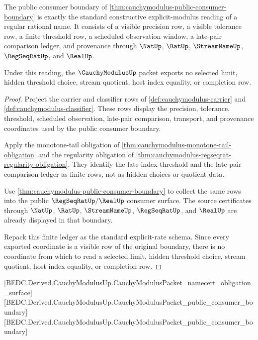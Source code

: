 \begin{theorem}
\label{thm:cauchymodulus-explicit-modulus-standard-bridge}
The public consumer boundary of
\autoref{thm:cauchymodulus-public-consumer-boundary} is exactly the standard
constructive explicit-modulus reading of a regular rational name. It consists
of a visible precision row, a visible tolerance row, a finite threshold row, a
scheduled observation window, a late-pair comparison ledger, and provenance
through $\NatUp$, $\RatUp$, $\StreamNameUp$, $\RegSeqRatUp$, and $\RealUp$.

Under this reading, the $\CauchyModulusUp$ packet exports no selected limit,
hidden threshold choice, stream quotient, host index equality, or completion
row.
\end{theorem}
\begin{proof}
Project the carrier and classifier rows of
\autoref{def:cauchymodulus-carrier} and
\autoref{def:cauchymodulus-classifier}. These rows display the precision,
tolerance, threshold, scheduled observation, late-pair comparison, transport,
and provenance coordinates used by the public consumer boundary.

Apply the monotone-tail obligation of
\autoref{thm:cauchymodulus-monotone-tail-obligation} and the regularity
obligation of \autoref{thm:cauchymodulus-regseqrat-regularity-obligation}.
They identify the late-index threshold and the late-pair comparison ledger as
finite rows, not as hidden choices or quotient data.

Use \autoref{thm:cauchymodulus-public-consumer-boundary} to collect the same
rows into the public $\RegSeqRatUp/\RealUp$ consumer surface. The source
certificates through $\NatUp$, $\RatUp$, $\StreamNameUp$, $\RegSeqRatUp$, and
$\RealUp$ are already displayed in that boundary.

Repack this finite ledger as the standard explicit-rate schema. Since every
exported coordinate is a visible row of the original boundary, there is no
coordinate from which to read a selected limit, hidden threshold choice, stream
quotient, host index equality, or completion row.
\end{proof}

[BEDC.Derived.CauchyModulusUp.CauchyModulusPacket\_namecert\_obligation\_surface]
[BEDC.Derived.CauchyModulusUp.CauchyModulusPacket\_public\_consumer\_boundary]
[BEDC.Derived.CauchyModulusUp.CauchyModulusPacket\_public\_consumer\_boundary]

